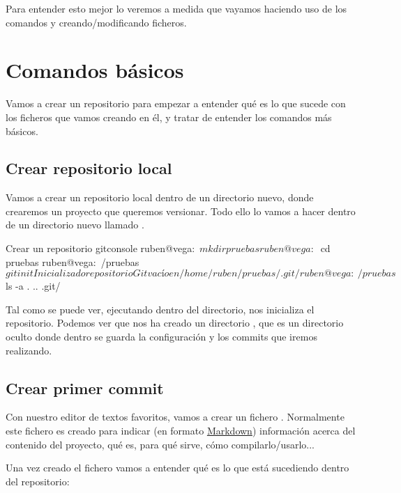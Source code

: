 Para entender esto mejor lo veremos a medida que vayamos haciendo uso de los comandos y creando/modificando ficheros.

\chapter{Comandos básicos}

Vamos a crear un repositorio para empezar a entender qué es lo que sucede con los ficheros que vamos creando en él, y tratar de entender los comandos más básicos.

\section{Crear repositorio local}

Vamos a crear un repositorio local dentro de un directorio nuevo, donde crearemos un proyecto que queremos versionar. Todo ello lo vamos a hacer dentro de un directorio nuevo llamado .

\begin{mycode}{Crear un repositorio git}{console}{}
ruben@vega:~$ mkdir pruebas
ruben@vega:~$ cd pruebas
ruben@vega:~/pruebas$ git init
Inicializado repositorio Git vacío en /home/ruben/pruebas/.git/

ruben@vega:~/pruebas$ ls -a
.  ..  .git/
\end{mycode}

Tal como se puede ver, ejecutando  dentro del directorio, nos inicializa el repositorio. Podemos ver que nos ha creado un directorio , que es un directorio oculto donde dentro se guarda la configuración y los commits que iremos realizando.



\section{Crear primer commit}

Con nuestro editor de textos favoritos, vamos a crear un fichero . Normalmente este fichero es creado para indicar (en formato \href{https://es.wikipedia.org/wiki/Markdown}{Markdown}) información acerca del contenido del proyecto, qué es, para qué sirve, cómo compilarlo/usarlo...

Una vez creado el fichero vamos a entender qué es lo que está sucediendo dentro del repositorio:

